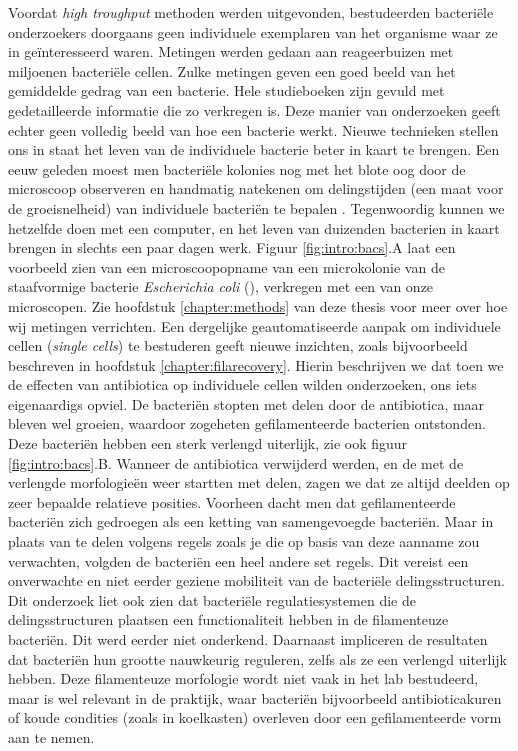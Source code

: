 Voordat \textit{high troughput} methoden werden uitgevonden, 
bestudeerden bacteriële onderzoekers doorgaans geen individuele exemplaren van het organisme waar ze in geïnteresseerd waren. 
%
Metingen werden gedaan aan reageerbuizen met miljoenen bacteriële cellen.
%
Zulke metingen geven een goed beeld van het gemiddelde gedrag van een bacterie. 
Hele studieboeken zijn gevuld met gedetailleerde informatie die zo verkregen is.
%
Deze manier van onderzoeken geeft echter geen volledig beeld van hoe een bacterie werkt.
%
Nieuwe technieken stellen ons in staat het leven van de individuele bacterie beter in kaart te brengen.
%
Een eeuw geleden moest men 
bacteriële kolonies nog met het blote oog door de microscoop observeren en 
handmatig 
natekenen
om delingstijden (een maat voor de groeisnelheid) van individuele bacteriën te bepalen \cite{Kelly1932}.
%
Tegenwoordig
kunnen we hetzelfde doen met een computer, 
en het leven van duizenden bacterien in kaart brengen in slechts een paar dagen werk.
%
Figuur \ref{fig:intro:bacs}.A laat een voorbeeld zien van een microscoopopname van een microkolonie van de staafvormige bacterie \textit{Escherichia coli} (\ecoli),
verkregen met een van onze microscopen.
%
Zie hoofdstuk \ref{chapter:methods} van deze thesis voor meer over hoe wij metingen verrichten. 
%
Een dergelijke geautomatiseerde aanpak 
om individuele cellen (\textit{single cells}) te bestuderen 
geeft nieuwe inzichten,  
%
zoals bijvoorbeeld beschreven in hoofdstuk \ref{chapter:filarecovery}.
%
Hierin beschrijven we dat 
toen we de effecten van antibiotica op individuele cellen wilden onderzoeken, 
ons iets eigenaardigs opviel. %
%
De bacteriën stopten met delen door de antibiotica, 
maar bleven wel groeien,
waardoor zogeheten gefilamenteerde bacterien ontstonden.
%
Deze bacteriën hebben een sterk verlengd uiterlijk,
zie ook figuur \ref{fig:intro:bacs}.B.
%
Wanneer de antibiotica verwijderd werden, en de \ecoli met de verlengde morfologieën weer startten met delen, 
zagen we dat ze altijd deelden op zeer bepaalde relatieve posities.
%
Voorheen dacht men dat gefilamenteerde bacteriën zich gedroegen als een ketting van samengevoegde bacteriën.
%
Maar in plaats van te delen volgens regels zoals je die op basis van deze aanname zou verwachten,
volgden de bacteriën een heel andere set regels.
%
Dit vereist een onverwachte en niet eerder geziene mobiliteit van de bacteriële delingsstructuren.
%
Dit onderzoek liet ook zien dat bacteriële regulatiesystemen die de delingsstructuren plaatsen een functionaliteit hebben in de filamenteuze bacteriën.
Dit werd eerder niet onderkend. %
%
Daarnaast impliceren de resultaten dat bacteriën hun grootte nauwkeurig reguleren, zelfs als ze een 
verlengd uiterlijk hebben. 
%
Deze filamenteuze morfologie wordt niet vaak in het lab bestudeerd, maar is wel relevant in de praktijk, waar bacteriën bijvoorbeeld antibioticakuren of koude condities (zoals in koelkasten) overleven door een gefilamenteerde vorm aan te nemen.


